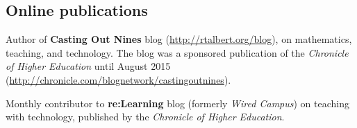 \documentclass[letterpaper]{article}
\renewenvironment{itemize}{
  \begin{list}{}{
    \setlength{\leftmargin}{1.5em}
	\setlength{\itemsep}{0in}
  }
}{
  \end{list}
}
\begin{document}
\subsection*{Online publications}

\begin{itemize}
	\item Author of \textbf{Casting Out Nines} blog (\url{http://rtalbert.org/blog}), on mathematics, teaching, and technology. The blog was a sponsored publication of the \emph{Chronicle of Higher Education} until August 2015 (\url{http://chronicle.com/blognetwork/castingoutnines}).
	\item Monthly contributor to \textbf{re:Learning} blog (formerly \emph{Wired Campus}) on teaching with technology, published by the \emph{Chronicle of Higher Education}. 
\end{itemize}
\end{document}
